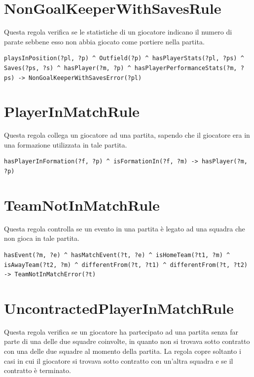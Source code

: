 \documentclass[11pt]{report} %
\begin{document}
\begin{itemize}[leftmargin=*]
\section{NonGoalKeeperWithSavesRule}

Questa regola verifica se le statistiche di un giocatore indicano il numero di parate sebbene esso non abbia giocato come portiere nella partita.

\begin{lstlisting}[language=SWRL]
playsInPosition(?pl, ?p) ^ Outfield(?p) ^ hasPlayerStats(?pl, ?ps) ^ Saves(?ps, ?s) ^ hasPlayer(?m, ?p) ^ hasPlayerPerformanceStats(?m, ?ps) -> NonGoalKeeperWithSavesError(?pl)
\end{lstlisting}

\section{PlayerInMatchRule}

Questa regola collega un giocatore ad una partita, sapendo che il giocatore era in una formazione utilizzata in tale partita.

\begin{lstlisting}[language=SWRL]
hasPlayerInFormation(?f, ?p) ^ isFormationIn(?f, ?m) -> hasPlayer(?m, ?p)
\end{lstlisting}

\section{TeamNotInMatchRule}

Questa regola controlla se un evento in una partita è legato ad una squadra che non gioca in tale partita.

\begin{lstlisting}[language=SWRL]
hasEvent(?m, ?e) ^ hasMatchEvent(?t, ?e) ^ isHomeTeam(?t1, ?m) ^ isAwayTeam(?t2, ?m) ^ differentFrom(?t, ?t1) ^ differentFrom(?t, ?t2) -> TeamNotInMatchError(?t)
\end{lstlisting}

\newpage

\section{UncontractedPlayerInMatchRule}

Questa regola verifica se un giocatore ha partecipato ad una partita senza far parte di una delle due squadre coinvolte, in quanto non si trovava sotto contratto con una delle due squadre al momento della partita.
La regola copre soltanto i casi in cui il giocatore si trovava sotto contratto con un'altra squadra e se il contratto è terminato.


\end{itemize}
\end{document}
